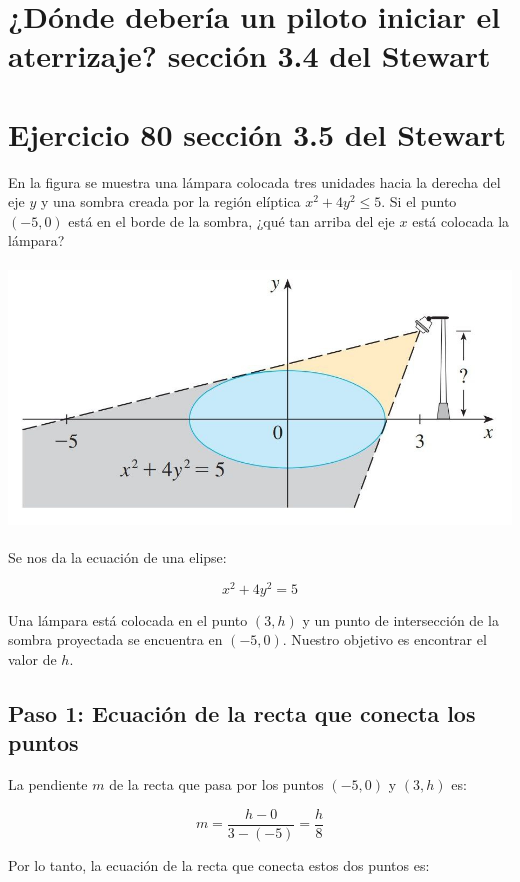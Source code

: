 \documentclass[11pt,letterpaper]{article}
\begin{document}
\section*{¿Dónde debería un piloto iniciar el aterrizaje? sección 3.4 del Stewart }
\section*{Ejercicio 80 sección 3.5 del Stewart}

En la figura se muestra una lámpara colocada tres unidades hacia la derecha del eje \( y \) y una sombra creada por la región elíptica \( x^2 + 4y^2 \leq 5 \). Si el punto \( (-5, 0) \) está en el borde de la sombra, ¿qué tan arriba del eje \( x \) está colocada la lámpara?

\begin{center}
    \includegraphics[height=7.0cm]{./imagenes/lampara.jpg}
\end{center}

Se nos da la ecuación de una elipse:

\[
x^2 + 4y^2 = 5
\]

Una lámpara está colocada en el punto \( (3, h) \) y un punto de intersección de la sombra proyectada se encuentra en \( (-5, 0) \). Nuestro objetivo es encontrar el valor de \(h\).

\subsection{Paso 1: Ecuación de la recta que conecta los puntos}

La pendiente \(m\) de la recta que pasa por los puntos \( (-5, 0) \) y \( (3, h) \) es:

\[
m = \frac{h - 0}{3 - (-5)} = \frac{h}{8}
\]

Por lo tanto, la ecuación de la recta que conecta estos dos puntos es:
\end{document}
